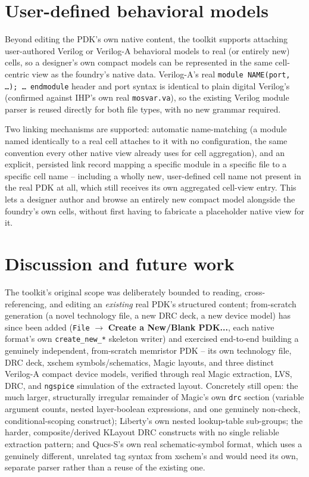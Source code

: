 \documentclass[a4paper,11pt]{article}
\begin{document}
\section{User-defined behavioral models}

Beyond editing the PDK's own native content, the toolkit supports
attaching user-authored Verilog or Verilog-A behavioral models to
real (or entirely new) cells, so a designer's own compact models can
be represented in the same cell-centric view as the foundry's native
data. Verilog-A's real \texttt{module NAME(port, \ldots);\ \ldots\ endmodule}
header and port syntax is identical to plain digital Verilog's
(confirmed against IHP's own real \texttt{mosvar.va}), so the
existing Verilog module parser is reused directly for both file
types, with no new grammar required.

Two linking mechanisms are supported: automatic name-matching (a
module named identically to a real cell attaches to it with no
configuration, the same convention every other native view already
uses for cell aggregation), and an explicit, persisted link record
mapping a specific module in a specific file to a specific cell name
-- including a wholly new, user-defined cell name not present in the
real PDK at all, which still receives its own aggregated cell-view
entry. This lets a designer author and browse an entirely new
compact model alongside the foundry's own cells, without first having
to fabricate a placeholder native view for it.

\section{Discussion and future work}

The toolkit's original scope was deliberately bounded to reading,
cross-referencing, and editing an \emph{existing} real PDK's
structured content; from-scratch generation (a novel technology file,
a new DRC deck, a new device model) has since been added
(\texttt{File} $\to$ \textbf{Create a New/Blank PDK...}, each native
format's own \texttt{create\_new\_*} skeleton writer) and exercised
end-to-end building a genuinely independent, from-scratch memristor
PDK -- its own technology file, DRC deck, xschem symbols/schematics,
Magic layouts, and three distinct Verilog-A compact device models,
verified through real Magic extraction, LVS, DRC, and \texttt{ngspice}
simulation of the extracted layout. Concretely still open: the much
larger, structurally irregular remainder of
Magic's own \texttt{drc} section (variable argument counts, nested
layer-boolean expressions, and one genuinely non-check, conditional-scoping
construct); Liberty's own nested lookup-table sub-groups; the
harder, composite/derived KLayout DRC constructs with no single
reliable extraction pattern; and Qucs-S's own real schematic-symbol
format, which uses a genuinely different, unrelated tag syntax from
xschem's and would need its own, separate parser rather than a reuse
of the existing one.
\end{document}
